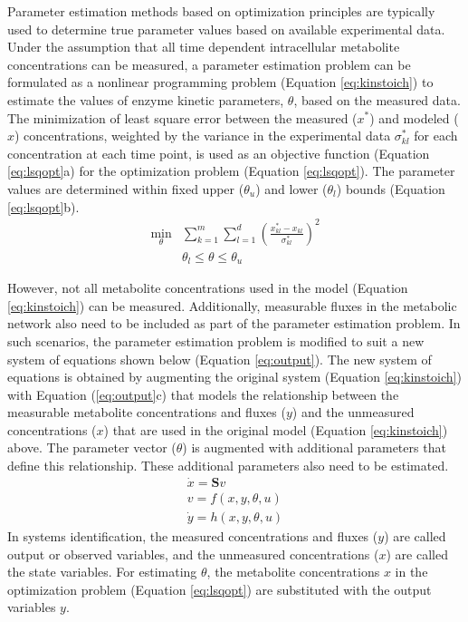 \documentclass[10pt]{article}
\begin{document}
	Parameter estimation methods based on optimization principles are typically used to determine true parameter values based on available experimental data. Under the assumption that all time dependent intracellular metabolite concentrations can be measured, a parameter estimation problem can be formulated as a nonlinear programming problem (Equation \ref{eq:kinstoich}) to estimate the values of enzyme kinetic parameters, $\theta$, based on the measured data. 	
	The minimization of least square error between the measured ($x^*$) and modeled ($x$) concentrations, weighted by the variance in the experimental data $\sigma_{kl}^*$ for each concentration at each time point, is used as an objective function (Equation \ref{eq:lsqopt}a) for the optimization problem (Equation \ref{eq:lsqopt}). The parameter values are determined within fixed upper ($\theta_u$) and lower ($\theta_l$) bounds (Equation \ref{eq:lsqopt}b). 
	\begin{subequations}\label{eq:lsqopt}
		\begin{align}
		\underset{\theta}{\mathrm{min}} &\sum_{k=1}^{m}\sum_{l=1}^{d}\left(\frac{x_{kl}^*-x_{kl}}{\sigma_{kl}^*}\right)^2\\
		&\theta_l \le \theta \le \theta_u
		\end{align}
	\end{subequations}
	
	However, not all metabolite concentrations used in the model (Equation \ref{eq:kinstoich}) can be measured. Additionally, measurable fluxes in the metabolic network also need to be included as part of the parameter estimation problem. In such scenarios, the parameter estimation problem is modified to suit a new system of equations shown below (Equation \ref{eq:output}). The new system of equations is obtained by augmenting the original system (Equation \ref{eq:kinstoich}) with Equation (\ref{eq:output}c) that models the relationship between the measurable metabolite concentrations and fluxes ($y$) and the unmeasured concentrations ($x$) that are used in the original model (Equation \ref{eq:kinstoich}) above. The parameter vector ($\theta$) is augmented with additional parameters that define this relationship. These additional parameters also need to be estimated.
	\begin{subequations}\label{eq:output}
		\begin{align}
		\dot{x} = \mathbf{S}v\\
		v = f(x, y, \theta, u)\\
		\dot{y} = h(x, y, \theta, u)
		\end{align}
	\end{subequations}
	In systems identification, the measured concentrations and fluxes ($y$) are called output or observed variables, and the unmeasured concentrations ($x$) are called the state variables. For estimating $\theta$, the metabolite concentrations $x$ in the optimization problem (Equation \ref{eq:lsqopt}) are substituted with the output variables $y$. 
	
\end{document}
